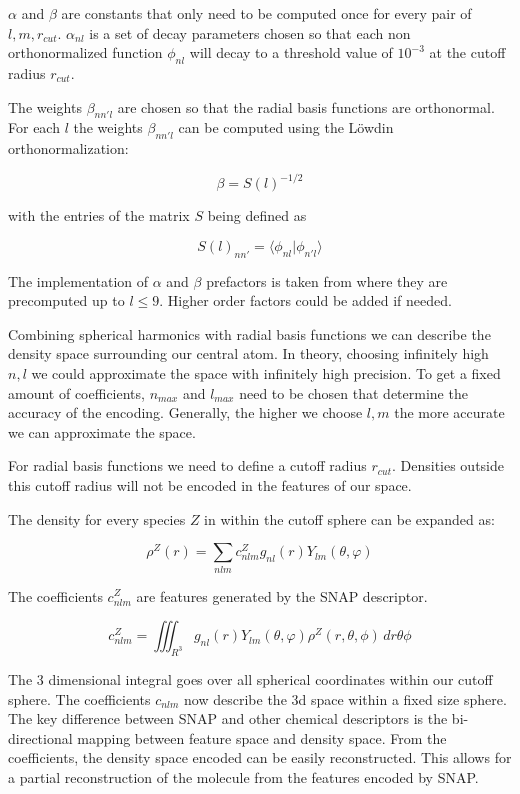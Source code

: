 $\alpha$ and $\beta$ are constants that only need to be computed once for every pair of $l,m, r_{cut}$.
$\alpha_{nl}$ is a set of decay parameters chosen so that each non orthonormalized function $\phi_{nl}$ 
will decay to a threshold value of $10^{-3}$ at the cutoff radius $r_{cut}$.

The weights $\beta_{nn'l}$ are chosen so that the radial basis functions are orthonormal.
For each $l$ the weights $\beta_{nn'l}$ can be computed using the Löwdin orthonormalization:

$$\beta = S(l)^{-1/2} $$

with the entries of the matrix $S$ being defined as

$$S(l)_{nn'} = \langle \phi_{nl} | \phi_{n'l} \rangle  $$

The implementation of $\alpha$ and $\beta$ prefactors is taken from \cite{dscribe} where they are precomputed up to $l \leq 9$.
Higher order factors could be added if needed.


Combining spherical harmonics with radial basis functions we can describe the density space surrounding our central atom.
In theory, choosing infinitely high $n, l$ we could approximate the space with infinitely high precision.
To get a fixed amount of coefficients, $n_{max}$ and $l_{max}$ need to be chosen that determine the
accuracy of the encoding.
Generally, the higher we choose $l, m$ the more accurate we can approximate the space.

For radial basis functions we need to define a cutoff radius $r_{cut}$.
Densities outside this cutoff radius will not be encoded in the features of our space.

The density for every species $Z$ in within the cutoff sphere can be expanded as:

$$ \rho^Z(r) = \sum_{nlm} c^Z_{nlm} g_{nl}(r) Y_{lm}(\theta, \varphi) $$

The coefficients $c_{nlm}^Z$ are features generated by the SNAP descriptor.

$$ c_{nlm}^Z = \iiint_{R^3} g_{nl}(r) Y_{lm}(\theta, \varphi) \rho^Z(r, \theta, \phi)  \,dr\theta\phi   $$

The 3 dimensional integral goes over all spherical coordinates within our cutoff sphere.
The coefficients $c_{nlm}$ now describe the 3d space within a fixed size sphere.
\\
The key difference between SNAP and other chemical descriptors is the bi-directional mapping between feature space and 
density space.
From the coefficients, the density space encoded can be easily reconstructed.
This allows for a partial reconstruction of the molecule from the features encoded by SNAP.

